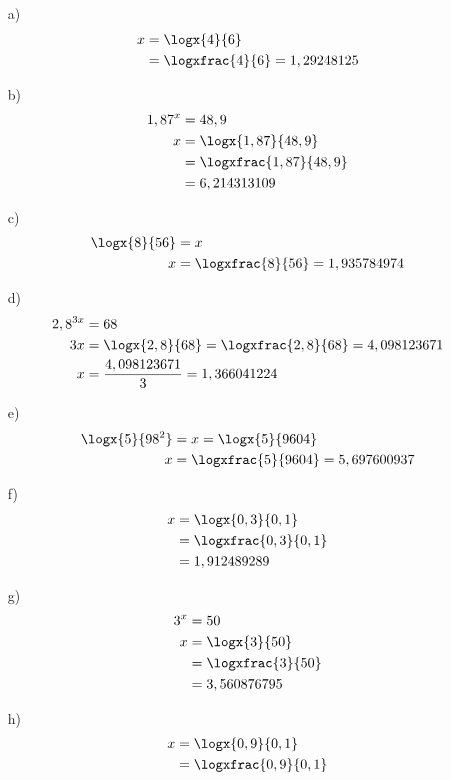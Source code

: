 \begin{antwoord}{16}
\begin{enumerate}
 \item[a)]
\begin{align*}
  x &= \logx{4}{6} \\
  &= \logxfrac{4}{6} = 1,29248125
\end{align*}
 \item[b)]
\begin{align*}
  1,87^x &= 48,9 \\
  x &= \logx{1,87}{48,9} \\
  &= \logxfrac{1,87}{48,9} \\
  &= 6,214313109
\end{align*}

 \item[c)]
 \begin{align*}
 \logx{8}{56} &= x \\
 x &= \logxfrac{8}{56} = 1,935784974  \\
 \end{align*}
 \item[d)]
 \begin{align*}
 2,8^{3x} &= 68 \\
 3x &= \logx{2,8}{68} = \logxfrac{2,8}{68} = 4,098123671\\
 x &= \frac{4,098123671}{3} = 1,366041224
 \end{align*}
 \item[e)]
 \begin{align*}
\logx{5}{98^2} &= x = \logx{5}{9604}  \\
 x &= \logxfrac{5}{9604} = 5,697600937
 \end{align*}
 \item[f)]
 \begin{align*}
x &= \logx{0,3}{0,1}  \\
&= \logxfrac{0,3}{0,1}  \\
&= 1,912489289
\end{align*}
 \item[g)]
 \begin{align*}
 3^x &= 50 \\
x &= \logx{3}{50}  \\
&= \logxfrac{3}{50}  \\
&= 3,560876795
\end{align*}
 \item[h)]
 \begin{align*}
x &= \logx{0,9}{0,1}  \\
&= \logxfrac{0,9}{0,1}  \\

\end{align*}
\end{enumerate}
\end{antwoord}
